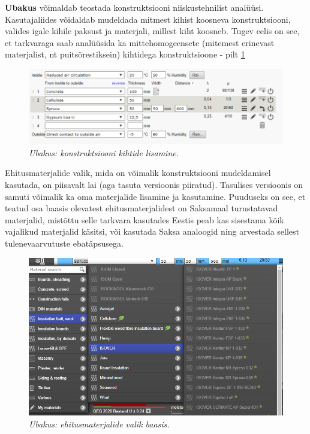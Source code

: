 \textbf{Ubakus} võimaldab teostada konstruktsiooni niiskustehnilist analüüsi. Kasutajaliides võidaldab 
mudeldada mitmest kihist koosneva konstruktsiooni, valides igale kihile paksust ja materjali, millest 
kiht koosneb. Tugev eelis on see, et tarkvaraga saab analüüsida ka mittehomogeensete (mitemest erinevast 
materjalist, nt puitsõrestiksein) kihtidega konstruktsioone - pilt \ref{fig:ubakus_layers}

\begin{figure}[ht]
    \centering
    \includegraphics[width=.6\textwidth]{figures/problem_statement/02_ubakus_layers.png}
    \caption{\textit{Ubakus: konstruktsiooni kihtide lisamine.}}
    \label{fig:ubakus_layers}
\end{figure}

Ehitusmaterjalide valik, mida on võimalik konstruktsiooni mudeldamisel kasutada, on piisavalt lai 
(aga tasuta versioonis piiratud). Tasulises versioonis on samuti võimalik ka oma materjalide 
lisamine ja kasutamine. Puuduseks on see, et teatud osa baasis olevatest ehitusmaterjalidest on Saksamaal
turustatavad materjalid, mistõttu selle tarkvara kasutades Eestis peab kas sisestama kõik vajalikud 
materjalid käsitsi, või kasutada Saksa analoogid ning arvestada sellest tulenevaarvutuste ebatäpsusega.
\begin{figure}[ht]
    \centering
    \includegraphics[width=.6\textwidth]{figures/problem_statement/03_ubakus_materials.png}
    \caption{\textit{Ubakus: ehitusmaterjalide valik baasis.}}
    \label{fig:ubakus_materials}
\end{figure}
